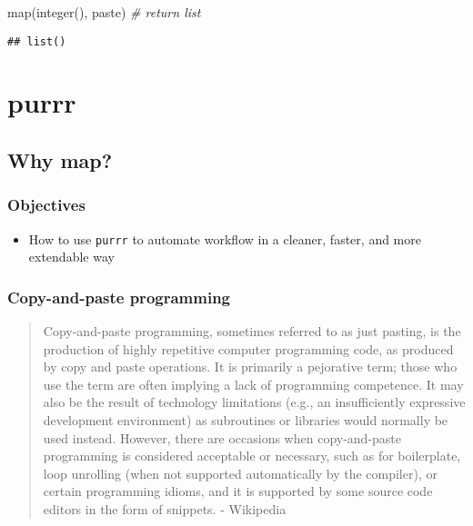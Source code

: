 \documentclass[
]{book}
\newenvironment{Shaded}{\begin{snugshade}}{\end{snugshade}}
\newcommand{\CommentTok}[1]{\textcolor[rgb]{0.56,0.35,0.01}{\textit{#1}}}
\newcommand{\FunctionTok}[1]{\textcolor[rgb]{0.00,0.00,0.00}{#1}}
\newcommand{\NormalTok}[1]{#1}
\providecommand{\tightlist}{%
  \setlength{\itemsep}{0pt}\setlength{\parskip}{0pt}}
\begin{document}
\begin{Shaded}
\begin{Highlighting}[]
\FunctionTok{map}\NormalTok{(}\FunctionTok{integer}\NormalTok{(), paste) }\CommentTok{\# return list}
\end{Highlighting}
\end{Shaded}

\begin{verbatim}
## list()
\end{verbatim}

\hypertarget{purrr}{%
\section{purrr}\label{purrr}}

\hypertarget{why-map}{%
\subsection{Why map?}\label{why-map}}

\hypertarget{objectives}{%
\subsubsection{Objectives}\label{objectives}}

\begin{itemize}
\tightlist
\item
  How to use \texttt{purrr} to automate workflow in a cleaner, faster, and more extendable way
\end{itemize}

\hypertarget{copy-and-paste-programming}{%
\subsubsection{Copy-and-paste programming}\label{copy-and-paste-programming}}

\begin{quote}
Copy-and-paste programming, sometimes referred to as just pasting, is the production of highly repetitive computer programming code, as produced by copy and paste operations. It is primarily a pejorative term; those who use the term are often implying a lack of programming competence. It may also be the result of technology limitations (e.g., an insufficiently expressive development environment) as subroutines or libraries would normally be used instead. However, there are occasions when copy-and-paste programming is considered acceptable or necessary, such as for boilerplate, loop unrolling (when not supported automatically by the compiler), or certain programming idioms, and it is supported by some source code editors in the form of snippets. - Wikipedia
\end{quote}
\end{document}
